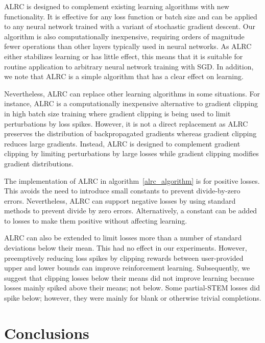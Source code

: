 \documentclass[letterpaper, 10 pt, conference]{ieeeconf}  %
\begin{document}
ALRC is designed to complement existing learning algorithms with new functionality. It is effective for any loss function or batch size and can be applied to any neural network trained with a variant of stochastic gradient descent. Our algorithm is also computationally inexpensive, requiring orders of magnitude fewer operations than other layers typically used in neural networks. As ALRC either stabilizes learning or has little effect, this means that it is suitable for routine application to arbitrary neural network training with SGD. In addition, we note that ALRC is a simple algorithm that has a clear effect on learning.

Nevertheless, ALRC can replace other learning algorithms in some situations. For instance, ALRC is a computationally inexpensive alternative to gradient clipping in high batch size training where gradient clipping is being used to limit perturbations by loss spikes. However, it is not a direct replacement as ALRC preserves the distribution of backpropagated gradients whereas gradient clipping reduces large gradients. Instead, ALRC is designed to complement gradient clipping by limiting perturbations by large losses while gradient clipping modifies gradient distributions.

The implementation of ALRC in algorithm~\ref{alrc_algorithm} is for positive losses. This avoids the need to introduce small constants to prevent divide-by-zero errors. Nevertheless, ALRC can support negative losses by using standard methods to prevent divide by zero errors. Alternatively, a constant can be added to losses to make them positive without affecting learning.

ALRC can also be extended to limit losses more than a number of standard deviations below their mean. This had no effect in our experiments. However, preemptively reducing loss spikes by clipping rewards between user-provided upper and lower bounds can improve reinforcement learning\cite{mnih2015human}. Subsequently, we suggest that clipping losses below their means did not improve learning because losses mainly spiked above their means; not below. Some partial-STEM losses did spike below; however, they were mainly for blank or otherwise trivial completions.

\section{Conclusions}
\end{document}
